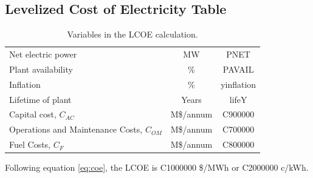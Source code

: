 \subsection{Levelized Cost of Electricity Table}

\begin{table}[h!] 
\begin{tabular}{l c c } 
Net electric power & MW & PNET \\
Plant availability & \% & PAVAIL \\
Inflation & \% & yinflation \\
Lifetime of plant & Years & lifeY \\
Capital cost, $C_{AC}$ &     M\$/annum    &    C900000      \\ 
Operations and Maintenance Costs, $C_{OM}$ & M\$/annum  &      C700000 \\ 
Fuel Costs, $C_{F}$ & M\$/annum  &       C800000 \\ 
    \end{tabular} 
    \caption{Variables in the LCOE calculation.}
    \label{tab:lcoe} 
\end{table} 

Following equation \ref{eq:coe}, the LCOE is C1000000 \$/MWh or C2000000 c/kWh.

